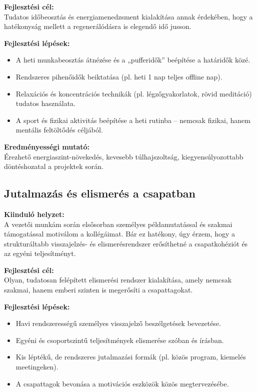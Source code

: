 \textbf{Fejlesztési cél:} \\
Tudatos időbeosztás és energiamenedzsment kialakítása annak érdekében, hogy a hatékonyság mellett a regenerálódásra is elegendő idő jusson.

\textbf{Fejlesztési lépések:}
\begin{itemize}
    \item A heti munkabeosztás átnézése és a „pufferidők” beépítése a határidők közé.
    \item Rendszeres pihenőidők beiktatása (pl. heti 1 nap teljes offline nap).
    \item Relaxációs és koncentrációs technikák (pl. légzőgyakorlatok, rövid meditáció) tudatos használata.
    \item A sport és fizikai aktivitás beépítése a heti rutinba – nemcsak fizikai, hanem mentális feltöltődés céljából.
\end{itemize}

\textbf{Eredményességi mutató:} \\
Érezhető energiaszint-növekedés, kevesebb túlhajszoltság, kiegyensúlyozottabb döntéshozatal a projektek során.

\subsection{Jutalmazás és elismerés a csapatban}

\textbf{Kiinduló helyzet:} \\
A vezetői munkám során elsősorban személyes példamutatással és szakmai támogatással motiválom a kollégáimat.
Bár ez hatékony, úgy érzem, hogy a strukturáltabb visszajelzés- és elismerésrendszer erősíthetné a csapatkohéziót és az egyéni teljesítményt.

\textbf{Fejlesztési cél:} \\
Olyan, tudatosan felépített elismerési rendszer kialakítása, amely nemcsak szakmai, hanem emberi szinten is megerősíti a csapattagokat.

\textbf{Fejlesztési lépések:}
\begin{itemize}
    \item Havi rendszerességű személyes visszajelző beszélgetések bevezetése.
    \item Egyéni és csoportszintű teljesítmények elismerése szóban és írásban.
    \item Kis léptékű, de rendszeres jutalmazási formák (pl. közös program, kiemelés meetingeken).
    \item A csapattagok bevonása a motivációs eszközök közös megtervezésébe.
\end{itemize}

